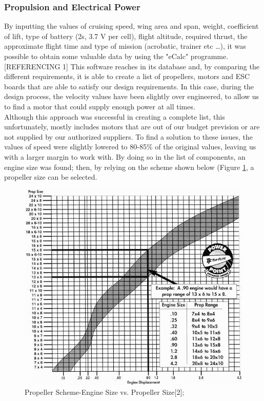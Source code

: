 \documentclass[12pt]{article}
\begin{document}
\newpage

\subsubsection{Propulsion and Electrical Power}

\noindent By inputting the values of cruising speed, wing area and span, weight, coefficient of lift, type of battery (2s, 3.7 V per cell), flight altitude, required thrust, the approximate flight time and  type of mission (acrobatic, trainer etc \ldots), it was possible to obtain some valuable data by using the "eCalc" programme.[REFERENCING 1] This software reaches in its database and, by comparing the different requirements, it is able to create a list of propellers, motors and ESC boards that are able to satisfy our design requirements. In this case, during the design process, the velocity values have been slightly over engineered, to allow us to find a motor that could supply enough power at all times. \\

\noindent Although this approach was successful in creating a complete list, this unfortunately, mostly includes motors that are out of our budget prevision or are not supplied by our authorized suppliers. To find a solution to these issues, the values of speed were slightly lowered to 80-85\% of the original values, leaving us with a larger margin to work with. By doing so in the list of components, an engine size was found; then, by relying on the scheme shown below (Figure \ref{fig:prop}, a propeller size can be selected. 

\begin{figure}[h!]
  \centering
  \includegraphics[width=13cm, scale=1]{propscheme.jpg}
  \caption{Propeller Scheme-Engine Size vs. Propeller Size[2];}
  \label{fig:prop}
\end{figure}
\end{document}
